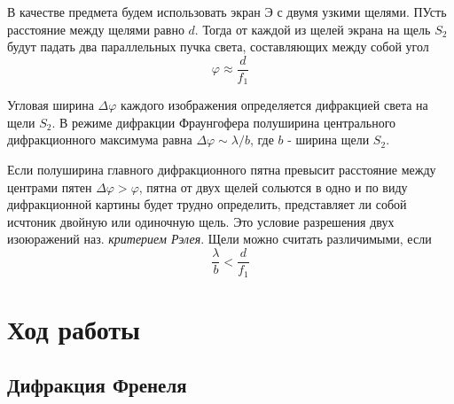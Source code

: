 \documentclass[a4paper,12pt]{article}
\begin{document}
В качестве предмета будем использовать экран Э с двумя узкими щелями. ПУсть расстояние между щелями равно $d$. Тогда от каждой из щелей экрана на щель $S_2$ будут падать два параллельных пучка света, составляющих между собой угол 
\begin{equation}
    \varphi \approx\frac{d}{f_1}
\end{equation}

Угловая ширина $\Delta \varphi$ каждого изображения определяется дифракцией света на щели $S_2$. В режиме дифракции Фраунгофера полуширина центрального дифракционного максимума равна $\Delta \varphi \sim \lambda/b$, где $b$ - ширина щели $S_2$.

Если полуширина главного дифракционного пятна превысит расстояние между центрами пятен $\Delta \varphi > \varphi$, пятна от двух щелей сольются в одно и по виду дифракционной картины будет трудно определить, представляет ли собой исчтоник двойную или одиночную щель. Это условие разрешения двух изоюражений наз. \textit{критерием Рэлея}. Щели можно считать различимыми, если
\begin{equation}
    \frac{\lambda}{b} < \frac{d}{f_1}
\end{equation}

\section{Ход работы}
\subsection{Дифракция Френеля}
\end{document}
